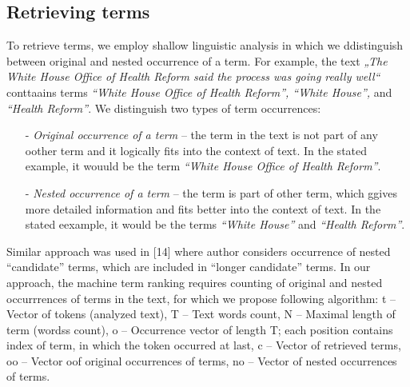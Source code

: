 \documentclass{llncs}
\begin{document}
\subsection{Retrieving terms}
To retrieve terms, we employ shallow linguistic analysis in which we ddistinguish between original and nested occurrence of a term. For example, the text \textit{„The White House Office of Health Reform said the process was going really well“} conttaains terms \textit{“White House Office of Health Reform”, “White House”,} and \textit{“Health Reform”}. We distinguish two types of term occurrences: 
\begin{itemize}
\item [-] \textit{Original occurrence of a term} – the term in the text is not part of any oother term and it logically fits into the context of text. In the stated example, it wouuld be the term \textit{“White House Office of Health Reform”}. 
\item [-] \textit{Nested occurrence of a term} – the term is part of other term, which ggives more detailed information and fits better into the context of text. In the stated eexample, it would be the terms \textit{“White House”} and \textit{“Health Reform”}. 
\end{itemize}

Similar approach was used in [14] where author considers occurrence of nested “candidate” terms, which are included in “longer candidate” terms. In our approach, the machine term ranking requires counting of original and nested occurrrences of terms in the text, for which we propose following algorithm: t – Vector of tokens (analyzed text), T – Text words count, N – Maximal length of term (wordss count), o – Occurrence vector of length T; each position contains index of term, in which the token occurred at last, c – Vector of retrieved terms, oo – Vector oof original occurrences of terms, no – Vector of nested occurrences of terms. 

\begin{comment}
*********************************************
TEN ALGORITMUS SOM ZAKOMENTOVAL,LATEX 
TO KVOLI VSETKYM TYM
ZATVORKAM NEMAL SANCU VHODNE SPRACOVAT :D
*********************************************
\begin{center}
The algorithm for term retrieving and occurrence ranking is as follows: 

\textit{t = input_text.tokenize(), T = t.lenght o = vector(T), oo = vector(T), no = vector(T) c = vector(0) 
 
for (i = 1 to T) {   potential_term = t[i] + t[i+1] ... t[i+N]   for (j = N to 0) {     if (j != N) removeLastToken(potential_term)     if (isTerm(potential_term)) {       if (not c.contains(potential_term)) 
        c.addNewTerm(potential_term)       C = c.indexOf(potential_term)       if (o[i] == -1 and o[i+j] == -1)  oo[C] += 1        else if (o[i] == o[i+j])          { no[C] += 1; c[C].setNestedIn(c[o[i]]) }       for (k = i to i+j) o[k] = C     }  }  } 
}
\end{center}
\end{comment}
\end{document}
